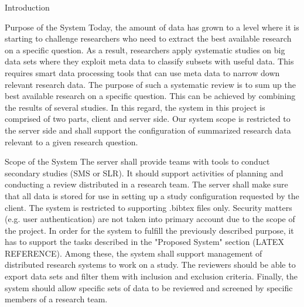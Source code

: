 \begin{section}{Introduction}

\begin{subsection}{Purpose of the System}
Today, the amount of data has grown to a level where it is starting to challenge researchers who need to extract the best available research on a specific question. As a result, researchers apply systematic studies on big data sets where they exploit meta data to classify subsets with useful data. This requires smart data processing tools that can use meta data to narrow down relevant research data. The purpose of such a systematic review is to sum up the best available research on a specific question. This can be achieved by combining the results of several studies. In this regard, the system in this project is comprised of two parts, client and server side. Our system scope is restricted to the server side and shall support the configuration of summarized research data relevant to a given research question. 
\end{subsection}

\begin{subsection}{Scope of the System}
The server shall provide teams with tools to conduct secondary studies (SMS or SLR). It should support activities of planning and conducting a review distributed in a research team. The server shall make sure that all data is stored for use in setting up a study configuration requested by the client. The system is restricted to supporting .bibtex files only. Security matters (e.g. user authentication) are not taken into primary account due to the scope of the project. 
In order for the system to fulfill the previously described purpose, it has to support the tasks described in the "Proposed System" section (LATEX REFERENCE). Among these, the system shall support management of distributed research systems to work on a study. The reviewers should be able to export data sets and filter them with inclusion and exclusion criteria. Finally, the system should allow specific sets of data to be reviewed and screened by specific members of a research team. 

\end{subsection}


\end{section}
